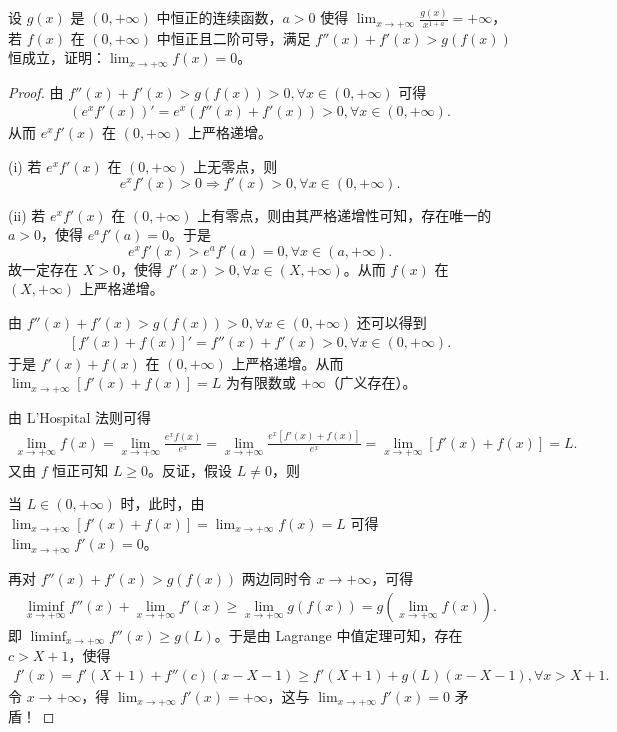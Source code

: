 \documentclass[../../main.tex]{subfiles}
\begin{document}
\vspace{0.5cm}

\begin{example}
设 \( g(x) \) 是 \( (0,+\infty) \) 中恒正的连续函数，\( a>0 \) 使得 \( \lim_{x \to +\infty} \frac{g(x)}{x^{1 + a}} = +\infty \)，若 \( f(x) \) 在 \( (0,+\infty) \) 中恒正且二阶可导，满足 \( f''(x) + f'(x) > g(f(x)) \) 恒成立，证明：\( \lim_{x \to +\infty} f(x) = 0 \)。
\end{example}
\begin{proof}
由 \( f''(x) + f'(x) > g(f(x)) > 0, \forall x \in (0,+\infty) \) 可得
\begin{align*}
\left( e^x f'(x) \right)' = e^x \left( f''(x) + f'(x) \right) > 0, \forall x \in (0,+\infty).
\end{align*}
从而 \( e^x f'(x) \) 在 \( (0,+\infty) \) 上严格递增。

(i) 若 \( e^x f'(x) \) 在 \( (0,+\infty) \) 上无零点，则
\[
e^x f'(x) > 0 \Rightarrow f'(x) > 0, \forall x \in (0,+\infty).
\]

(ii) 若 \( e^x f'(x) \) 在 \( (0,+\infty) \) 上有零点，则由其严格递增性可知，存在唯一的 \( a > 0 \)，使得 \( e^a f'(a) = 0 \)。于是
\[
e^x f'(x) > e^a f'(a) = 0, \forall x \in (a,+\infty).
\]
故一定存在 \( X > 0 \)，使得 \( f'(x) > 0, \forall x \in (X,+\infty) \)。从而 \( f(x) \) 在 \( (X,+\infty) \) 上严格递增。

由 \( f''(x) + f'(x) > g(f(x)) > 0, \forall x \in (0,+\infty) \) 还可以得到
\begin{align*}
\left[ f'(x) + f(x) \right]' = f''(x) + f'(x) > 0, \forall x \in (0,+\infty).
\end{align*}
于是 \( f'(x) + f(x) \) 在 \( (0,+\infty) \) 上严格递增。从而 \( \lim_{x \to +\infty} \left[ f'(x) + f(x) \right] = L \) 为有限数或 \( +\infty \)（广义存在）。

由 L'Hospital 法则可得
\begin{align*}
\lim_{x \to +\infty} f(x) = \lim_{x \to +\infty} \frac{e^x f(x)}{e^x} = \lim_{x \to +\infty} \frac{e^x \left[ f'(x) + f(x) \right]}{e^x} = \lim_{x \to +\infty} \left[ f'(x) + f(x) \right] = L.
\end{align*}
又由 \( f \) 恒正可知 \( L \geqslant  0 \)。反证，假设 \( L \neq 0 \)，则

\one 当 \( L \in (0,+\infty) \) 时，此时，由 \( \lim_{x \to +\infty} \left[ f'(x) + f(x) \right] = \lim_{x \to +\infty} f(x) = L \) 可得 \( \lim_{x \to +\infty} f'(x) = 0 \)。

再对 \( f''(x) + f'(x) > g(f(x)) \) 两边同时令 \( x \to +\infty \)，可得
\begin{align*}
\liminf_{x \to +\infty} f''(x) + \lim_{x \to +\infty} f'(x) \geqslant  \lim_{x \to +\infty} g(f(x)) = g\left( \lim_{x \to +\infty} f(x) \right).
\end{align*}
即 \( \liminf_{x \to +\infty} f''(x) \geqslant  g(L) \)。于是由 Lagrange 中值定理可知，存在 \( c > X + 1 \)，使得
\begin{align*}
f'(x) = f'(X + 1) + f''(c) (x - X - 1) \geqslant  f'(X + 1) + g(L) (x - X - 1), \forall x > X + 1.
\end{align*}
令 \( x \to +\infty \)，得 \( \lim_{x \to +\infty} f'(x) = +\infty \)，这与 \( \lim_{x \to +\infty} f'(x) = 0 \) 矛盾！


\end{proof}
\end{document}
